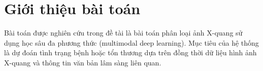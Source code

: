 

\pagebreak

\section{Giới thiệu bài toán}

Bài toán được nghiên cứu trong đề tài là bài toán phân loại ảnh X-quang sử dụng học sâu đa phương thức (multimodal deep learning). Mục tiêu của hệ thống là dự đoán tình trạng bệnh hoặc tổn thương dựa trên đồng thời dữ liệu hình ảnh X-quang và thông tin văn bản lâm sàng liên quan.

